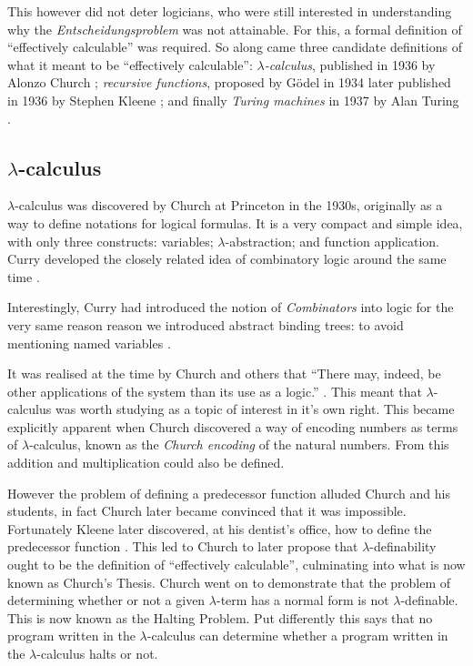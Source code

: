 This however did not deter logicians, who were still interested in understanding why the \emph{Entscheidungsproblem} was not attainable.
For this, a formal definition of ``effectively calculable'' was required.
So along came three candidate definitions of what it meant to be ``effectively calculable'': \emph{$\lambda$-calculus}, published in 1936 by Alonzo Church \cite{church-unsolvableproblemof-1936}; \emph{recursive functions}, proposed by G\"odel in 1934 later published in 1936 by Stephen Kleene \cite{kleene1936}; and finally \emph{Turing machines} in 1937 by Alan Turing \cite{turing1936a}.

\subsection{\texorpdfstring{$\lambda$}{}-calculus}

$\lambda$-calculus was discovered by Church at Princeton in the 1930s, originally as a way to define notations for logical formulas.
It is a very compact and simple idea, with only three constructs: variables; $\lambda$-abstraction; and function application.
Curry developed the closely related idea of combinatory logic around the same time \cite{curry1930a, curry1930b}.

Interestingly, Curry had introduced the notion of \emph{Combinators} into logic for the very same reason reason we introduced abstract binding trees: to avoid mentioning named variables \cite{Sorensen}.

It was realised at the time by Church and others that ``There may, indeed, be other applications of the system than its use as a logic.'' \cite{church1932, church1933}.
This meant that $\lambda$-calculus was worth studying as a topic of interest in it's own right.
This became explicitly apparent when Church discovered a way of encoding numbers as terms of $\lambda$-calculus, known as the \emph{Church encoding} of the natural numbers. From this addition and multiplication could also be defined.

However the problem of defining a predecessor function alluded Church and his students, in fact Church later became convinced that it was impossible.
Fortunately Kleene later discovered, at his dentist's office, how to define the predecessor function \cite{kleene1935a, kleene1935b, 4392910}.
This led to Church to later propose that $\lambda$-definability ought to be the definition of ``effectively calculable'', culminating into what is now known as Church's Thesis. Church went on to demonstrate that the problem of determining whether or not a given $\lambda$-term  has a normal form is not $\lambda$-definable.
This is now known as the Halting Problem. Put differently this says that no program written in the $\lambda$-calculus can determine whether a program written in the $\lambda$-calculus halts or not.

